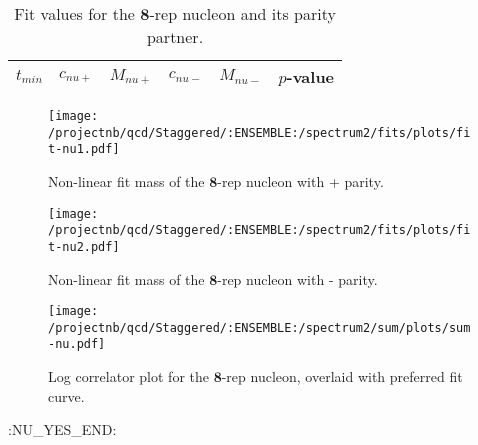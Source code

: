 \begin{table}[ht!]
\centering
\scriptsize
\begin{tabular}{|c|c|c|c|c|c|}
\hline
 $t_{min}$ & $c_{nu+}$ &  $M_{nu+}$ & $c_{nu-}$ & $M_{nu-}$ & $p$-value \\
\hline

\end{tabular}
\caption{Fit values for the $\mathbf{8}$-rep nucleon and its parity partner.}
\end{table}

\begin{multicols}{2}
\begin{figure}[H]
\centering
\texttt{[image: /projectnb/qcd/Staggered/:ENSEMBLE:/spectrum2/fits/plots/fit-nu1.pdf]}
\caption{Non-linear fit mass of the $\mathbf{8}$-rep nucleon with + parity.}
\end{figure}
\columnbreak
\begin{figure}[H]
\centering
\texttt{[image: /projectnb/qcd/Staggered/:ENSEMBLE:/spectrum2/fits/plots/fit-nu2.pdf]}
\caption{Non-linear fit mass of the $\mathbf{8}$-rep nucleon with - parity.}
\end{figure}
\end{multicols}

\begin{figure}[H]
\centering
\texttt{[image: /projectnb/qcd/Staggered/:ENSEMBLE:/spectrum2/sum/plots/sum-nu.pdf]}
\caption{Log correlator plot for the $\mathbf{8}$-rep nucleon, overlaid with preferred fit curve.}
\end{figure}

\clearpage
:NU_YES_END:


